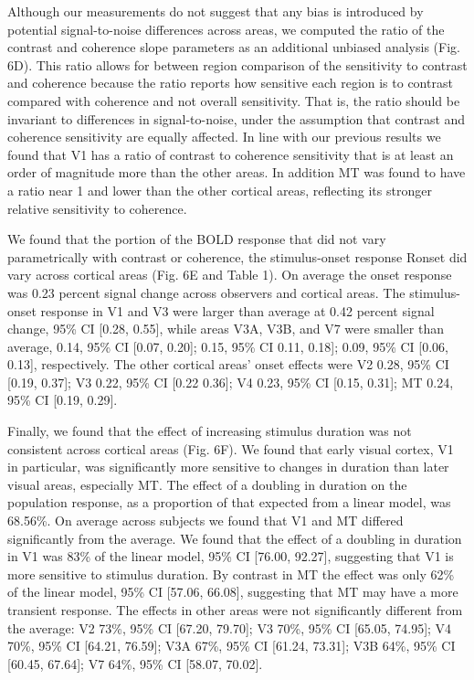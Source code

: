 \documentclass{report}
\begin{document}
Although our measurements do not suggest that any bias is introduced by potential signal-to-noise differences across areas, we computed the ratio of the contrast and coherence slope parameters as an additional unbiased analysis (Fig. 6D). This ratio allows for between region comparison of the sensitivity to contrast and coherence because the ratio reports how sensitive each region is to contrast compared with coherence and not overall sensitivity. That is, the ratio should be invariant to differences in signal-to-noise, under the assumption that contrast and coherence sensitivity are equally affected. In line with our previous results we found that V1 has a ratio of contrast to coherence sensitivity that is at least an order of magnitude more than the other areas. In addition MT was found to have a ratio near 1 and lower than the other cortical areas, reflecting its stronger relative sensitivity to coherence.

We found that the portion of the BOLD response that did not vary parametrically with contrast or coherence, the stimulus-onset response Ronset did vary across cortical areas (Fig. 6E and Table 1). On average the onset response was 0.23 percent signal change across observers and cortical areas. The stimulus-onset response in V1 and V3 were larger than average at 0.42 percent signal change, 95\% CI [0.28, 0.55], while areas V3A, V3B, and V7 were smaller than average, 0.14, 95\% CI [0.07, 0.20]; 0.15, 95\% CI 0.11, 0.18]; 0.09, 95\% CI [0.06, 0.13], respectively. The other cortical areas’ onset effects were V2 0.28, 95\% CI [0.19, 0.37]; V3 0.22, 95\% CI [0.22 0.36]; V4 0.23, 95\% CI [0.15, 0.31]; MT 0.24, 95\% CI [0.19, 0.29].

Finally, we found that the effect of increasing stimulus duration was not consistent across cortical areas (Fig. 6F). We found that early visual cortex, V1 in particular, was significantly more sensitive to changes in duration than later visual areas, especially MT. The effect of a doubling in duration on the population response, as a proportion of that expected from a linear model, was 68.56\%. On average across subjects we found that V1 and MT differed significantly from the average. We found that the effect of a doubling in duration in V1 was 83\% of the linear model, 95\% CI [76.00, 92.27], suggesting that V1 is more sensitive to stimulus duration. By contrast in MT the effect was only 62\% of the linear model, 95\% CI [57.06, 66.08], suggesting that MT may have a more transient response. The effects in other areas were not significantly different from the average: V2 73\%, 95\% CI [67.20, 79.70]; V3 70\%, 95\% CI [65.05, 74.95]; V4 70\%, 95\% CI [64.21, 76.59]; V3A 67\%, 95\% CI [61.24, 73.31]; V3B 64\%, 95\% CI [60.45, 67.64]; V7 64\%, 95\% CI [58.07, 70.02].
\end{document}
